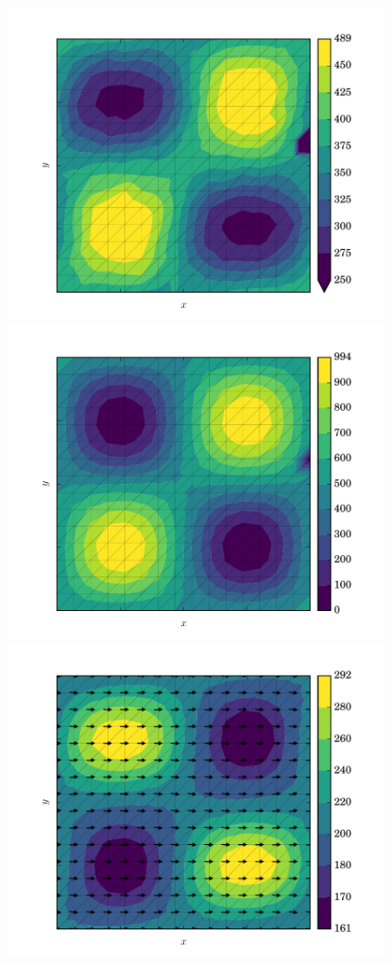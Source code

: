 \begin{figure}
  \centering
    \includegraphics[width=0.9\linewidth]{images/data_assimilation/ISMIP_HOM_C/TV/beta_SIA.pdf}
    \includegraphics[width=0.9\linewidth]{images/data_assimilation/ISMIP_HOM_C/TV/beta_true.pdf}
    \includegraphics[width=0.9\linewidth]{images/data_assimilation/ISMIP_HOM_C/TV/U_true.pdf}

\end{figure}
